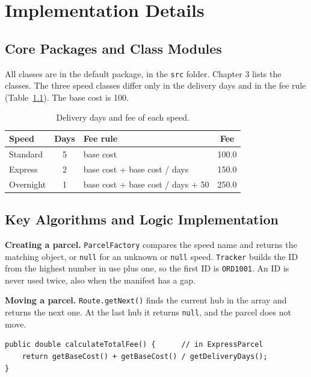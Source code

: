 \chapter{Implementation Details}

\section{Core Packages and Class Modules}
All classes are in the default package, in the \texttt{src} folder. Chapter 3
lists the classes. The three speed classes differ only in the delivery days
and in the fee rule (Table~\ref{tab:fees}). The base cost is 100.

\begin{table}[h]
\centering
\caption{Delivery days and fee of each speed.}
\label{tab:fees}
\renewcommand{\arraystretch}{1.3}
\begin{tabularx}{\textwidth}{|l|c|X|c|}
\hline
\textbf{Speed} & \textbf{Days} & \textbf{Fee rule} & \textbf{Fee}\\
\hline
Standard & 5 & base cost & 100.0\\
\hline
Express & 2 & base cost + base cost / days & 150.0\\
\hline
Overnight & 1 & base cost + base cost / days + 50 & 250.0\\
\hline
\end{tabularx}
\end{table}

\section{Key Algorithms and Logic Implementation}
\textbf{Creating a parcel.} \texttt{ParcelFactory} compares the speed name and
returns the matching object, or \texttt{null} for an unknown or \texttt{null}
speed. \texttt{Tracker} builds the ID from the highest number in use plus one,
so the first ID is \texttt{ORD1001}. An ID is never used twice, also when the
manifest has a gap.

\textbf{Moving a parcel.} \texttt{Route.getNext()} finds the current hub in the
array and returns the next one. At the last hub it returns \texttt{null}, and
the parcel does not move.

\begin{lstlisting}[style=java]
public double calculateTotalFee() {      // in ExpressParcel
    return getBaseCost() + getBaseCost() / getDeliveryDays();
}
\end{lstlisting}


